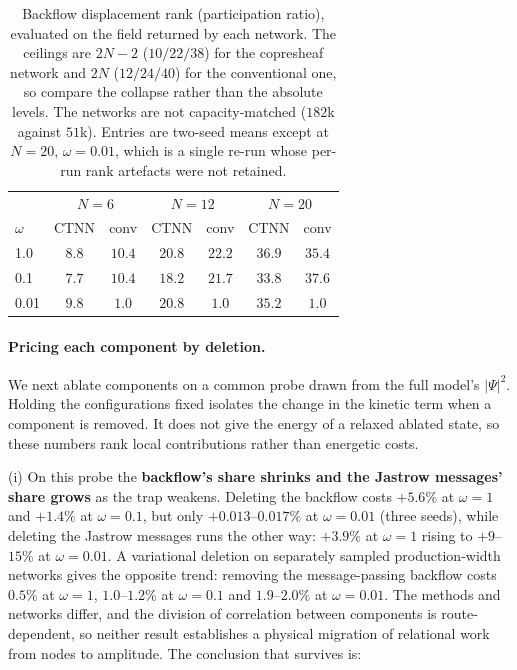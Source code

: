 \begin{table}[htbp]\centering
\caption[Backflow displacement rank (participation ratio)]{Backflow displacement rank
(participation ratio), evaluated on the field returned by each network. The ceilings are
$2N-2$ ($10/22/38$) for the copresheaf network and $2N$ ($12/24/40$) for the conventional
one, so compare the collapse rather than the absolute levels. The networks are not
capacity-matched ($182$k against $51$k). Entries are two-seed means except at $N=20$,
$\omega=0.01$, which is a single re-run whose per-run rank artefacts were not retained.}
\label{tab:bf_rank}
\begin{tabular}{l|cc|cc|cc}
\hline
 & \multicolumn{2}{c|}{$N=6$} & \multicolumn{2}{c|}{$N=12$} & \multicolumn{2}{c}{$N=20$}\\
$\omega$ & CTNN & conv & CTNN & conv & CTNN & conv \\
\hline
1.0  & $8.8$ & $10.4$ & $20.8$ & $22.2$ & $36.9$ & $35.4$ \\
0.1  & $7.7$ & $10.4$ & $18.2$ & $21.7$ & $33.8$ & $37.6$ \\
0.01 & $9.8$ & $\mathbf{1.0}$ & $20.8$ & $\mathbf{1.0}$ & $35.2$ & $\mathbf{1.0}$ \\
\hline
\end{tabular}
\end{table}

\paragraph{Pricing each component by deletion.} We next ablate components on a common probe
drawn from the full model's $|\Psi|^2$. Holding the configurations fixed isolates the change
in the kinetic term when a component is removed. It does not give the energy of a relaxed
ablated state, so these numbers rank local contributions rather than energetic costs.

(i) On this probe the \textbf{backflow's share shrinks and the Jastrow messages' share grows}
as the trap weakens. Deleting the backflow costs $+5.6\%$ at $\omega=1$ and $+1.4\%$ at
$\omega=0.1$, but only $+0.013$--$0.017\%$ at $\omega=0.01$ (three seeds), while deleting the
Jastrow messages runs the other way: $+3.9\%$ at $\omega=1$ rising to $+9$--$15\%$ at
$\omega=0.01$. A variational deletion on separately sampled production-width networks gives
the opposite trend: removing the message-passing backflow costs $0.5\%$ at $\omega=1$,
$1.0$--$1.2\%$ at $\omega=0.1$ and $1.9$--$2.0\%$ at $\omega=0.01$. The methods and networks
differ, and the division of correlation between components is route-dependent, so neither
result establishes a physical migration of relational work from nodes to amplitude. The
conclusion that survives is:

